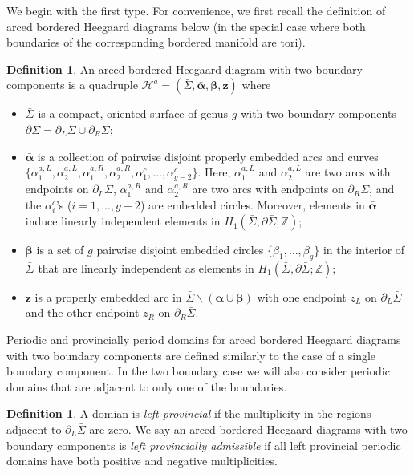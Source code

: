 \documentclass{amsart}
\theoremstyle{definition}
\newtheorem{defn}[thm]{Definition}
\theoremstyle{remark}
\numberwithin{equation}{section}
\numberwithin{equation}{section} \makeatletter
\begin{document}
We begin with the first type. For convenience, we first recall the definition of arced bordered Heegaard diagrams below (in the special case where both boundaries of the corresponding bordered manifold are tori).
\begin{defn}
An arced bordered Heegaard diagram with two boundary components is a quadruple $\mathcal{H}^a=(\bar{\Sigma},\bar{\bm{\alpha}},\bm{\beta},\bm{z})$ where 
\begin{itemize}
\item[(1)]$\bar{\Sigma}$ is a compact, oriented surface of genus $g$ with two boundary components $\partial\bar{\Sigma}=\partial_L\bar{\Sigma}\cup\partial_R\bar{\Sigma}$;
\item[(2)]$\bar{\bm{\alpha}}$ is a collection of pairwise disjoint properly embedded arcs and curves $\{\alpha^{a,L}_1,\alpha^{a,L}_2,\alpha^{a,R}_1,\alpha^{a,R}_2,\alpha^c_1,\ldots,\alpha^c_{g-2}\}$. Here, $\alpha^{a,L}_1$ and $\alpha^{a,L}_2$ are two arcs with endpoints on $\partial_L\bar{\Sigma}$, $\alpha^{a,R}_1$ and $\alpha^{a,R}_2$ are two arcs with endpoints on $\partial_R\bar{\Sigma}$, and the $\alpha^c_i$'s ($i=1,\ldots,g-2$) are embedded circles. Moreover, elements in $\bar{\bm{\alpha}}$ induce linearly independent elements in $H_1(\bar{\Sigma},\partial\bar{\Sigma};\mathbb{Z})$;
\item[(3)]$\bm{\beta}$ is a set of $g$ pairwise disjoint embedded circles $\{\beta_1,\ldots,\beta_g\}$ in the interior of $\bar{\Sigma}$ that are linearly independent as elements in $H_1(\bar{\Sigma},\partial\bar{\Sigma};\mathbb{Z})$;
\item[(4)]$\bm{z}$ is a properly embedded arc in $\bar{\Sigma}\backslash(\bar{\bm{\alpha}}\cup\bm{\beta})$ with one endpoint $z_L$ on $\partial_L\bar{\Sigma}$ and the other endpoint $z_R$ on $\partial_R\bar{\Sigma}$.
\end{itemize}
\end{defn}
Periodic and provincially period domains for arced bordered Heegaard diagrams with two boundary components are defined similarly to the case of a single boundary component. In the two boundary case we will also consider periodic domains that are adjacent to only one of the boundaries.

\begin{defn}
A domian is \emph{left provincial} if the multiplicity in the regions adjacent to $\partial_L \bar\Sigma$ are zero. We say an arced bordered Heegaard diagrams with two boundary components is \emph{left provincially admissible} if all left provincial periodic domains have both positive and negative multiplicities.
\end{defn}
\end{document}
